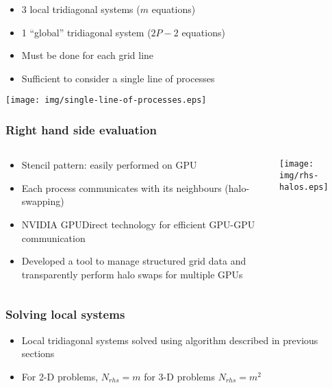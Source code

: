 \begin{frame}
\begin{itemize}
\item 3 local tridiagonal systems ($m$ equations)
\item 1 ``global'' tridiagonal system ($2P-2$ equations)
\item Must be done for each grid line
\item Sufficient to consider a single line of processes
\end{itemize}
\begin{center}
\texttt{[image: img/single-line-of-processes.eps]}
\end{center}
\end{frame}

\begin{frame}
\frametitle{Right hand side evaluation}
\begin{columns}
\begin{column}{0.5\textwidth}
\begin{itemize}
\item Stencil pattern: easily performed on GPU
\item Each process communicates with its neighbours
    (halo-swapping)
\item NVIDIA GPUDirect technology for efficient
    GPU-GPU communication
\item Developed a tool to manage structured grid data
    and transparently perform halo swaps
    for multiple GPUs
\end{itemize}
\end{column}
\begin{column}{0.5\textwidth}
\texttt{[image: img/rhs-halos.eps]}
\end{column}
\end{columns}
\end{frame}

\begin{frame}
\frametitle{Solving local systems}
\begin{itemize}
\item Local tridiagonal systems solved using
    algorithm described in previous sections
\item For 2-D problems,
    $N_{rhs} = m$
    for 3-D problems
    $N_{rhs} = m^2$
\end{itemize}
\end{frame}

